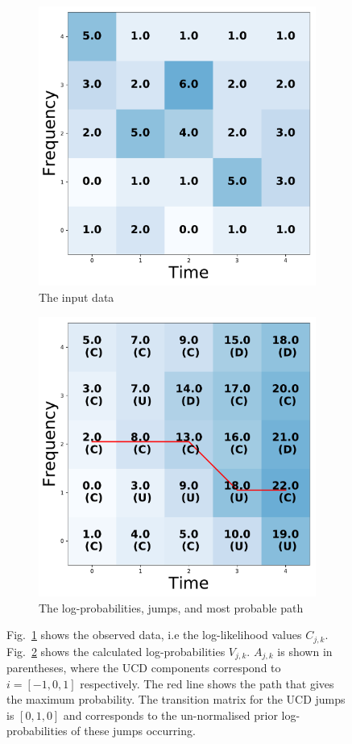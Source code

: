 \begin{figure}
\centering
\begin{subfigure}[h]{0.8\columnwidth}
\includegraphics[width=0.8\columnwidth]{C3_soap/vit_data.pdf}
\caption{The input data}
\label{viterbi:plot:data}
\end{subfigure}

\begin{subfigure}[h]{0.8\columnwidth}
\includegraphics[width=0.8\columnwidth]{C3_soap/vit_prob.pdf}
\caption{The log-probabilities, jumps, and most probable path}
\label{viterbi:plot:likelihood}
\end{subfigure}

\caption{ Fig.~\ref{viterbi:plot:data} shows
the observed data, i.e the log-likelihood values $C_{j,k}$. Fig.~\ref{viterbi:plot:likelihood} shows the calculated
log-probabilities $V_{j,k}$. $A_{j,k}$ is shown in parentheses, where the \ac{UCD}
components correspond to $i= [-1,0,1]$ respectively. The red line shows the
path that gives the maximum probability. The transition matrix for the \ac{UCD} jumps is $[0,1,0]$ and corresponds to the un-normalised prior
log-probabilities of these jumps occurring.}
\label{viterbi:plots}
\end{figure}

